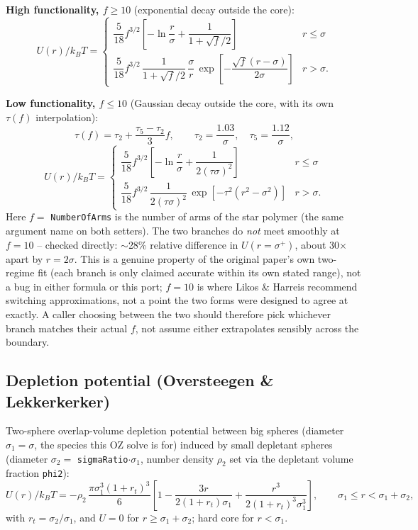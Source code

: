 \documentclass[11pt,a4paper]{article}
\newcommand{\code}[1]{\texttt{#1}}
\begin{document}
\textbf{High functionality, $f\ge10$} (exponential decay outside the core):
\begin{equation}
  U(r)/k_BT =
  \begin{cases}
    \dfrac{5}{18}f^{3/2}\left[-\ln\!\dfrac{r}{\sigma}+\dfrac{1}{1+\sqrt{f}/2}\right] & r\le\sigma\\[2ex]
    \dfrac{5}{18}f^{3/2}\,\dfrac{1}{1+\sqrt{f}/2}\,\dfrac{\sigma}{r}\,
      \exp\!\left[-\dfrac{\sqrt{f}(r-\sigma)}{2\sigma}\right] & r>\sigma.
  \end{cases}
\end{equation}

\textbf{Low functionality, $f\le10$} (Gaussian decay outside the core, with
its own $\tau(f)$ interpolation):
\begin{equation}
  \tau(f) = \tau_2 + \frac{\tau_5-\tau_2}{3}f, \qquad
  \tau_2 = \frac{1.03}{\sigma}, \quad \tau_5 = \frac{1.12}{\sigma},
\end{equation}
\begin{equation}
  U(r)/k_BT =
  \begin{cases}
    \dfrac{5}{18}f^{3/2}\left[-\ln\!\dfrac{r}{\sigma}+\dfrac{1}{2(\tau\sigma)^2}\right] & r\le\sigma\\[2ex]
    \dfrac{5}{18}f^{3/2}\,\dfrac{1}{2(\tau\sigma)^2}\,
      \exp\!\left[-\tau^2(r^2-\sigma^2)\right] & r>\sigma.
  \end{cases}
\end{equation}
Here $f=$ \code{NumberOfArms} is the number of arms of the star polymer
(the same argument name on both setters). The two branches do \emph{not}
meet smoothly at $f=10$ -- checked directly: $\sim$28\% relative
difference in $U(r=\sigma^+)$, about 30$\times$ apart by $r=2\sigma$.
This is a genuine property of the original paper's own two-regime fit
(each branch is only claimed accurate within its own stated range), not
a bug in either formula or this port; $f=10$ is where Likos \& Harreis
recommend switching approximations, not a point the two forms were
designed to agree at exactly. A caller choosing between the two should
therefore pick whichever branch matches their actual $f$, not assume
either extrapolates sensibly across the boundary.

\subsection{Depletion potential (Oversteegen \& Lekkerkerker) \cite{oversteegen2004}}
\label{sec:depletion}
Two-sphere overlap-volume depletion potential between big spheres (diameter
$\sigma_1=\sigma$, the species this OZ solve is for) induced by small
depletant spheres (diameter $\sigma_2=$ \code{sigmaRatio}$\cdot\sigma_1$, number
density $\rho_2$ set via the depletant volume fraction \code{phi2}):
\begin{equation}
  U(r)/k_BT = -\rho_2\,\frac{\pi\sigma_1^3(1+r_t)^3}{6}
  \left[1-\frac{3r}{2(1+r_t)\sigma_1}+\frac{r^3}{2(1+r_t)^3\sigma_1^3}\right],
  \qquad \sigma_1\le r<\sigma_1+\sigma_2,
\end{equation}
with $r_t=\sigma_2/\sigma_1$, and $U=0$ for $r\ge\sigma_1+\sigma_2$; hard core
for $r<\sigma_1$.
\end{document}
